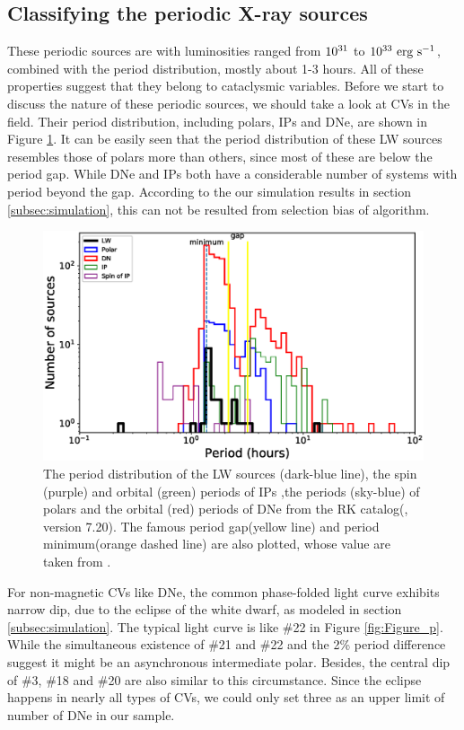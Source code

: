 \documentclass[twoside,twocolumn]{aastex63}
\begin{document}
\subsection{Classifying the periodic X-ray sources}
\label{subsec:class}
These periodic sources are with luminosities ranged from $\rm 10^{31}$ to $\rm 10^{33}~erg~s^{-1}$, combined with the period distribution, mostly about 1-3 hours. All of these properties suggest that they belong to cataclysmic variables. 
Before we start to discuss the nature of these periodic sources, we should take a look at CVs in the field. Their period distribution, including polars, IPs and DNe, are shown in Figure \ref{fig:N_P}.
It can be easily seen that the period distribution of these LW sources resembles those of polars more than others, since most of these are below the period gap. While DNe and IPs both have a considerable number of systems with period beyond the gap. According to the our simulation results in section \ref{subsec:simulation}, this can not be resulted from selection bias of algorithm. 

\begin{figure}[htbp]
\centering
\includegraphics[scale=0.73]{./figure/CV/N_P.eps}
\caption{The period distribution of the LW sources (dark-blue line), the spin (purple) and orbital (green) periods of IPs ,the periods (sky-blue) of polars and the orbital (red) periods of DNe from the RK catalog(\cite{2003A&A...404..301R}, version 7.20). The famous period gap(yellow line) and period minimum(orange dashed line) are also plotted, whose value are taken from \citep{2011ApJS..194...28K}.\label{fig:N_P}}
\end{figure}
For non-magnetic CVs like DNe, the common phase-folded light curve exhibits narrow dip, due to the eclipse of the white dwarf, as modeled in section \ref{subsec:simulation}. The typical light curve is like \#22 in Figure \ref{fig:Figure_p}. 	While the simultaneous existence of \#21 and \#22 and the 2\% period difference suggest it might be an asynchronous intermediate polar. Besides, the central dip of \#3, \#18 and \#20 are also similar to this circumstance. Since the eclipse happens in nearly all types of CVs, we could only set three as an upper limit of number of DNe in our sample.
\end{document}
